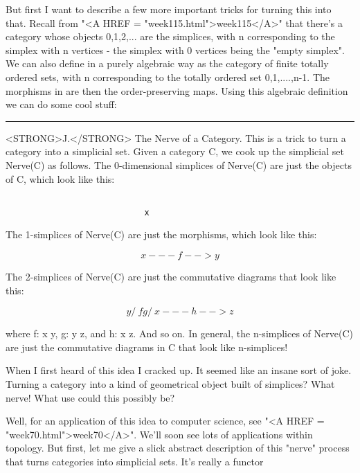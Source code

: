 But first I want to describe a few more important tricks for turning
this into that.  Recall from "<A HREF =
"week115.html">week115</A>" that there's a category \Delta  whose
objects 0,1,2,... are the simplices, with n corresponding to the
simplex with n vertices - the simplex with 0 vertices being the
"empty simplex".  We can also define \Delta  in a purely
algebraic way as the category of finite totally ordered sets, with n
corresponding to the totally ordered set {0,1,....,n-1}.  The
morphisms in \Delta  are then the order-preserving maps.  Using this
algebraic definition we can do some cool stuff:

\par\noindent\rule{\textwidth}{0.4pt}
<STRONG>J.</STRONG>  The Nerve of a Category.  This is a trick to turn a category into a
simplicial set.  Given a category C, we cook up the simplicial set
Nerve(C) as follows.  The 0-dimensional simplices of Nerve(C) are just
the objects of C, which look like this:


\begin{verbatim}

                            x
\end{verbatim}
    
The 1-simplices of Nerve(C) are just the morphisms, which look like
this:


$$

                        x---f-->y
$$
    
The 2-simplices of Nerve(C) are just the commutative diagrams that
look like this:


$$

                            y
                           / \                 
                          f   g
                         /     \
                        x---h-->z 
$$
    
where f: x \to  y, g: y \to  z, and h: x \to  z.  And so on.  In general,
the n-simplices of Nerve(C) are just the commutative diagrams in 
C that look like n-simplices!  

When I first heard of this idea I cracked up.  It seemed like an insane
sort of joke.  Turning a category into a kind of geometrical object
built of simplices?  What nerve!  What use could this possibly be?  

Well, for an application of this idea to computer science, see "<A HREF = "week70.html">week70</A>".
We'll soon see lots of applications within topology.  But first, let me
give a slick abstract description of this "nerve" process that turns
categories into simplicial sets.  It's really a functor

